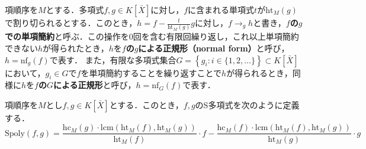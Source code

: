 項順序を$M$とする．多項式$f, g \in K[\bar{X}]$に対し，$f$に含まれる単項式$t$が$\mathrm{ht}_M(g)$で割り切られるとする．このとき，$h = f - \frac{t}{\mathrm{ht}_M(g)}g$に対し，$f \to_g h$と書き，\textbf{$f$の$g$での単項簡約}と呼ぶ．この操作を$0$回を含む有限回繰り返し，これ以上単項簡約できない$h$が得られたとき，$h$を\textbf{$f$の$g$による正規形（normal form）}と呼び，$h = \mathrm{nf}_g(f)$で表す．
また，有限な多項式集合$G=\left\{g_i :i \in \{1,2, \dots\}\right\} \subset K[\bar{X}]$において，$g_i \in G$で$f$を単項簡約することを繰り返すことで$h$が得られるとき，同様に$h$を\textbf{$f$の$G$による正規形}と呼び，$h = \mathrm{nf}_G(f)$で表す．
\begin{definition}[S多項式]
	項順序を$M$とし$f, g \in K[\bar{X}]$とする．このとき，$f, g$のS多項式を次のように定義する．
	$$\mathrm{Spoly}(f, g)=\frac{\mathrm{hc}_M(g)\cdot \mathrm{lcm}(\mathrm{ht}_M(f), \mathrm{ht}_M(g))}{\mathrm{ht}_M(f)}\cdot f - \frac{\mathrm{hc}_M(f)\cdot \mathrm{lcm}(\mathrm{ht}_M(f), \mathrm{ht}_M(g))}{\mathrm{ht}_M(g)}\cdot g$$
	\end{definition}








